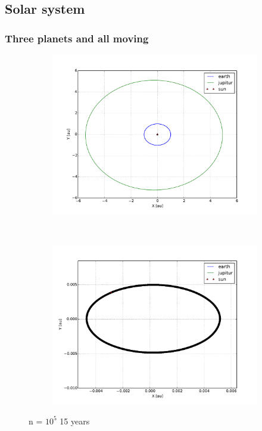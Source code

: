 \subsection{Solar system}


\subsubsection{Three planets and all moving}

\begin{figure}[H]
    \centering
    \begin{subfigure}{0.5\textwidth}
        \centering
        \includegraphics[width=\linewidth]{result/bilder/all-moving-jupitur.pdf}
        \caption{}
    \end{subfigure}%
    ~ 
    \begin{subfigure}{0.5\textwidth}
        \centering
        \includegraphics[width=\linewidth]{result/bilder/all-moving-jupitur-mass-center.pdf}
        \caption{}
    \end{subfigure}
    \caption{n = $10^5$ 15 years}
    \label{fig:three-body-varying}
\end{figure}

